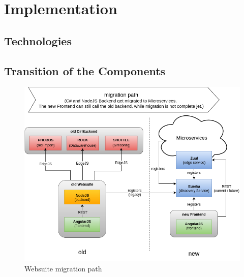 
\chapter{Implementation}



\section{Technologies}


\section{Transition of the Components}
\begin{figure}[H]
	\centering\includegraphics[width=1\textwidth]{res/Websuite_migration}
	\caption{Websuite migration path}
	\label{fig:websuite-migration}
\end{figure}

